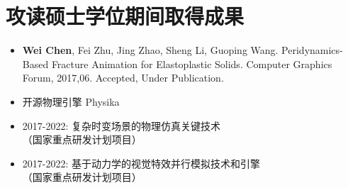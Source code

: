 ﻿\chapter{攻读硕士学位期间取得成果}

\begin{itemize}
  \item \textbf{Wei Chen}, Fei Zhu, Jing Zhao, Sheng Li, Guoping Wang. Peridynamics-Based Fracture Animation for Elastoplastic Solids. Computer Graphics Forum, 2017,06. Accepted, Under Publication.
\end{itemize}

\vspace*{5cm}

\begin{itemize}
  \item 开源物理引擎 Physika
  \item 2017-2022: 复杂时变场景的物理仿真关键技术\\
  （国家重点研发计划项目）
  \item 2017-2022: 基于动力学的视觉特效并行模拟技术和引擎\\
  （国家重点研发计划项目）
\end{itemize}
